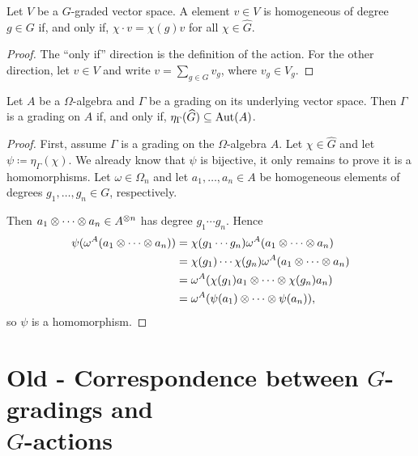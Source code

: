 \begin{lemma}
    Let $V$ be a $G$-graded vector space. 
    A element $v\in V$ is homogeneous of degree $g\in G$ if, and only if, $\chi\cdot v = \chi(g)v$ for all $\chi \in \widehat G$.
\end{lemma}

\begin{proof}
    The ``only if'' direction is the definition of the action. 
    For the other direction, let $v\in V$ and write $v = \sum_{g\in G} v_g$, where $v_g \in V_g$.
\end{proof}

\begin{prop}
    Let $A$ be a $\Omega$-algebra and $\Gamma$ be a grading on its underlying vector space. 
    Then $\Gamma$ is a grading on $A$ if, and only if, $\eta_\Gamma(\widehat G) \subseteq \operatorname{Aut}(A)$.
\end{prop}

\begin{proof}
    First, assume $\Gamma$ is a grading on the $\Omega$-algebra $A$.
    Let $\chi \in \widehat G$ and let $\psi \coloneqq \eta_\Gamma(\chi)$. 
    We already know that $\psi$ is bijective, it only remains to prove it is a homomorphisms. 
    Let $\omega \in \Omega_n$ and let $a_1, \ldots, a_n \in A$ be homogeneous elements of degrees $g_1, \ldots, g_n \in G$, respectively.
    
    Then $a_1\otimes \cdots \otimes a_n \in A^{\otimes n}$ has degree $g_1 \cdots g_n$. Hence
    \begin{align*}
        \psi(\omega^A(a_1\otimes \cdots \otimes a_n)) &= \chi(g_1 \cdots g_n) \omega^A(a_1\otimes \cdots \otimes a_n)\\
        &=\chi(g_1) \cdots \chi(g_n) \omega^A(a_1\otimes \cdots \otimes a_n)\\
        &= \omega^A(\chi(g_1)a_1\otimes \cdots \otimes \chi(g_n)a_n)\\
        &= \omega^A(\psi(a_1)\otimes \cdots \otimes \psi(a_n)),
    \end{align*}
    so $\psi$ is a homomorphism.
\end{proof}



\section{Old - Correspondence between $G$-gradings and\\ $\widehat G$-actions}\label{ssec:G-hat-action}

